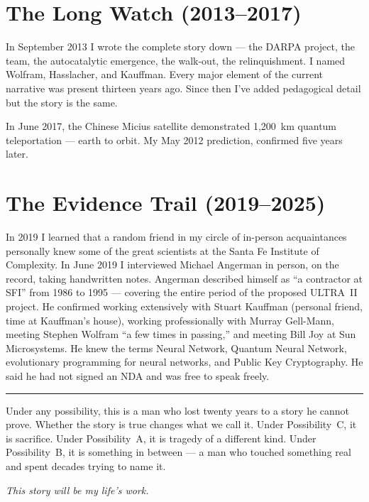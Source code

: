 \section*{The Long Watch (2013--2017)}
\label{pos29:the-long-watch}

In September 2013 I wrote the complete story down --- the DARPA project, the team, the autocatalytic emergence, the walk-out, the relinquishment. I named Wolfram, Hasslacher, and Kauffman. Every major element of the current narrative was present thirteen years ago. Since then I've added pedagogical detail but the story is the same.

In June 2017, the Chinese Micius satellite demonstrated 1,200~km quantum teleportation --- earth to orbit. My May 2012 prediction, confirmed five years later.

\section*{The Evidence Trail (2019--2025)}
\label{pos29:the-evidence-trail}

In 2019 I learned that a random friend in my circle of in-person acquaintances personally knew some of the great scientists at the Santa Fe Institute of Complexity. In June 2019 I interviewed Michael Angerman in person, on the record, taking handwritten notes. Angerman described himself as ``a contractor at SFI'' from 1986 to 1995 --- covering the entire period of the proposed ULTRA~II project. He confirmed working extensively with Stuart Kauffman (personal friend, time at Kauffman's house), working professionally with Murray Gell-Mann, meeting Stephen Wolfram ``a few times in passing,'' and meeting Bill Joy at Sun Microsystems. He knew the terms Neural Network, Quantum Neural Network, evolutionary programming for neural networks, and Public Key Cryptography. He said he had not signed an NDA and was free to speak freely.

\vspace{1cm}\noindent\rule{0.5\textwidth}{0.5pt}\vspace{0.5cm}

Under any possibility, this is a man who lost twenty years to a story he cannot prove. Whether the story is true changes what we call it. Under Possibility~C, it is sacrifice. Under Possibility~A, it is tragedy of a different kind. Under Possibility~B, it is something in between --- a man who touched something real and spent decades trying to name it.

\begin{center}\textit{This story will be my life's work.}\end{center}

\chapterreturn
